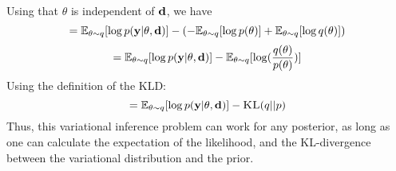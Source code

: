 Using that $\theta$ is independent of $\mathbf{d}$, we have
\begin{equation}= \mathbb{E}_{\theta \sim q}[\log p(\mathbf{y}| \theta , \mathbf{d})]-(-\mathbb{E}_{\theta \sim q}[\log p(\theta)] + \mathbb{E}_{\theta \sim q}[\log q(\theta)])\end{equation}
\begin{equation}= \mathbb{E}_{\theta \sim q}[\log p(\mathbf{y}| \theta , \mathbf{d})]-\mathbb{E}_{\theta \sim q}[\log (\frac{q(\theta)}{p(\theta)})]\end{equation}
Using the definition of the KLD:
\begin{equation}\label{eq:elbo-3}= \mathbb{E}_{\theta \sim q}[\log p(\mathbf{y}| \theta , \mathbf{d})]- \textsc{KL}(q || p)\end{equation}
Thus, this variational inference problem can work for any posterior, as long as one can calculate the expectation of the likelihood, and the KL-divergence between the variational distribution and the prior.
